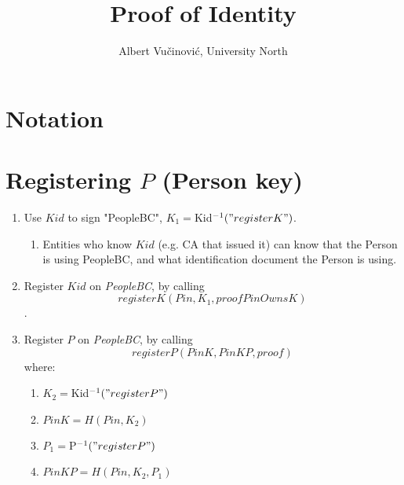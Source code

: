 \documentclass{article}
\title{Proof of Identity}
\author{Albert Vučinović, University North}
\newcommand{\khk}{$P$}
\newcommand{\kid}{$Kid$}
\newcommand{\pbc}{\textit{PeopleBC}}
\begin{document}
\maketitle
\section{Notation}

\newpage
\section{Registering \khk{} (Person key)}
\begin{enumerate}
  \item Use \kid{} to sign "PeopleBC", $K_1 = \kid^{-1}("registerK")$.
  \begin{enumerate}
    \item Entities who know \kid{} (e.g. CA that issued it) can know that the Person is using PeopleBC, and what identification document the Person is using.
  \end{enumerate}
  \item Register \kid{} on \pbc, by calling 
    $$registerK(Pin, K_1, proofPinOwnsK)$$.
  \item Register \khk{} on \pbc, by calling 
    $$registerP(PinK, PinKP, proof)$$
  where:
    \begin{enumerate}
      \item $K_2=\kid^{-1}("registerP")$
      \item $PinK=H(Pin,K_2)$
      \item $P_1 = \khk^{-1}("registerP")$
      \item $PinKP=H(Pin, K_2, P_1)$
    \end{enumerate}
\end{enumerate}

\newpage
\end{document}
